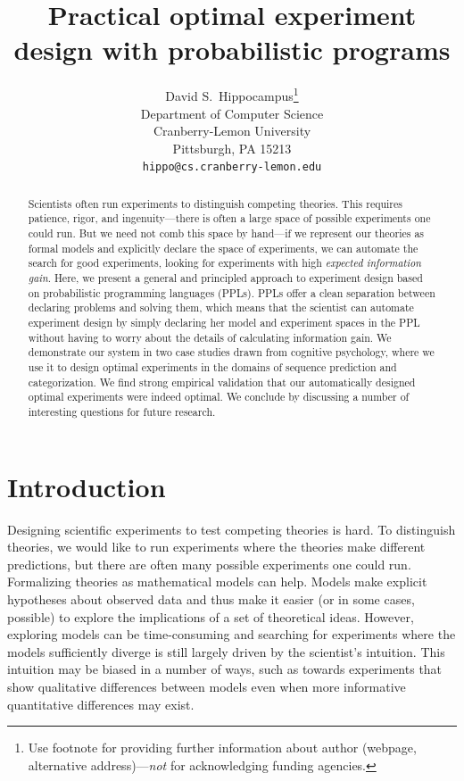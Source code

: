 \documentclass{article}
\title{Practical optimal experiment design with probabilistic programs}
\author{
  David S.~Hippocampus\thanks{Use footnote for providing further
    information about author (webpage, alternative
    address)---\emph{not} for acknowledging funding agencies.} \\
  Department of Computer Science\\
  Cranberry-Lemon University\\
  Pittsburgh, PA 15213 \\
  \texttt{hippo@cs.cranberry-lemon.edu} \\
}
\newcommand{\ndg}[1]{\textcolor{Green}{[ndg: #1]}}
\newcommand{\mht}[1]{\textcolor{Blue}{[mht: #1]}}
\newcommand{\lou}[1]{\textcolor{orange}{[lou: #1]}}
\begin{document}

\maketitle

\begin{abstract}

Scientists often run experiments to distinguish competing theories.
This requires patience, rigor, and ingenuity---there is often a large space of possible experiments one could run.
But we need not comb this space by hand---if we represent our theories as formal models and explicitly declare the space of experiments, we can automate the search for good experiments, looking for experiments with high \emph{expected information gain}.
Here, we present a general and principled approach to experiment design based on probabilistic programming languages (PPLs).
PPLs offer a clean separation between declaring problems and solving them, which means that the scientist can automate experiment design by simply declaring her model and experiment spaces in the PPL without having to worry about the details of calculating information gain.
We demonstrate our system in two case studies drawn from cognitive psychology, where we use it to design optimal experiments in the domains of sequence prediction and categorization.
We find strong empirical validation that our automatically designed optimal experiments were indeed optimal.
We conclude by discussing a number of interesting questions for future research.


\end{abstract}


\section{Introduction}
Designing scientific experiments to test competing theories is hard.
To distinguish theories, we would like to run experiments where the theories make different predictions, but there are often many possible experiments one could run.
Formalizing theories as mathematical models can help.
Models make explicit hypotheses about observed data and thus make it easier (or in some cases, possible) to explore the implications of a set of theoretical ideas.
However, exploring models can be time-consuming and searching for experiments where the models sufficiently diverge is still largely driven by the scientist's intuition.
This intuition may be biased in a number of ways, such as towards experiments that show qualitative differences between models even when more informative quantitative differences may exist.
\end{document}
